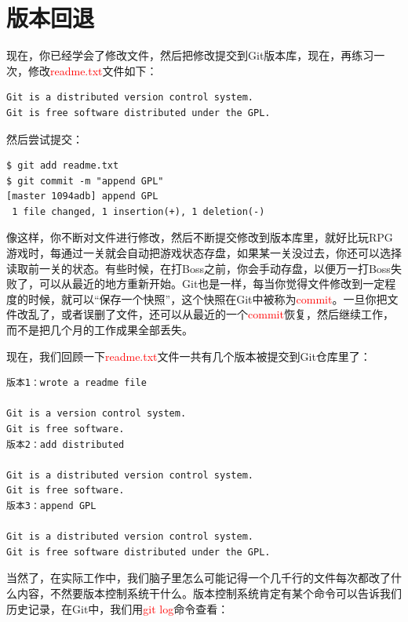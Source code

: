 \section{版本回退}
现在，你已经学会了修改文件，然后把修改提交到Git版本库，现在，再练习一次，修改\textcolor{red}{readme.txt}文件如下：

\begin{verbatim}
Git is a distributed version control system.
Git is free software distributed under the GPL.
\end{verbatim}

然后尝试提交：

\begin{verbatim}
$ git add readme.txt
$ git commit -m "append GPL"
[master 1094adb] append GPL
 1 file changed, 1 insertion(+), 1 deletion(-)
\end{verbatim}

像这样，你不断对文件进行修改，然后不断提交修改到版本库里，就好比玩RPG游戏时，每通过一关就会自动把游戏状态存盘，如果某一关没过去，你还可以选择读取前一关的状态。有些时候，在打Boss之前，你会手动存盘，以便万一打Boss失败了，可以从最近的地方重新开始。Git也是一样，每当你觉得文件修改到一定程度的时候，就可以“保存一个快照”，这个快照在Git中被称为\textcolor{red}{commit}。一旦你把文件改乱了，或者误删了文件，还可以从最近的一个\textcolor{red}{commit}恢复，然后继续工作，而不是把几个月的工作成果全部丢失。

现在，我们回顾一下\textcolor{red}{readme.txt}文件一共有几个版本被提交到Git仓库里了：

\begin{verbatim}
版本1：wrote a readme file

Git is a version control system.
Git is free software.
版本2：add distributed

Git is a distributed version control system.
Git is free software.
版本3：append GPL

Git is a distributed version control system.
Git is free software distributed under the GPL.
\end{verbatim}

当然了，在实际工作中，我们脑子里怎么可能记得一个几千行的文件每次都改了什么内容，不然要版本控制系统干什么。版本控制系统肯定有某个命令可以告诉我们历史记录，在Git中，我们用\textcolor{red}{git log}命令查看：

